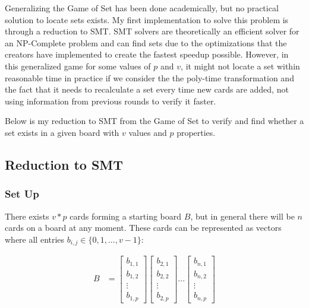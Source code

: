 \documentclass[pageno]{jpaper}
\begin{document}
Generalizing the Game of Set has been done academically, but no practical solution to locate sets exists. My first implementation to solve this problem is through a reduction to SMT. SMT solvers are theoretically an efficient solver for an NP-Complete problem and can find sets due to the optimizations that the creators have implemented to create the fastest speedup possible. However, in this generalized game for some values of $p$ and $v$, it might not locate a set within reasonable time in practice if we consider the the poly-time transformation and the fact that it needs to recalculate a set every time new cards are added, not using information from previous rounds to verify it faster. 

Below is my reduction to SMT from the Game of Set to verify and find whether a set exists in a given board with $v$ values and $p$ properties.


\subsection{Reduction to SMT}

\subsubsection{Set Up}

There exists $v*p$ cards forming a starting board $B$, but in general there will be $n$ cards on a board at any moment. These cards can be represented as vectors where all entries $b_{i,j} \in \{0,1, ... , v-1\}$:

\begin{align}
    B &= \begin{bmatrix}
           b_{1,1} \\
           b_{1,2} \\
           \vdots \\
           b_{1,p}
         \end{bmatrix}
         \begin{bmatrix}
           b_{2,1} \\
           b_{2,2} \\
           \vdots \\
           b_{2,p}
         \end{bmatrix} ... 
          \begin{bmatrix}
           b_{n,1} \\
           b_{n,2} \\
           \vdots \\
           b_{n,p}
         \end{bmatrix}
  \end{align}
  
\end{document}
